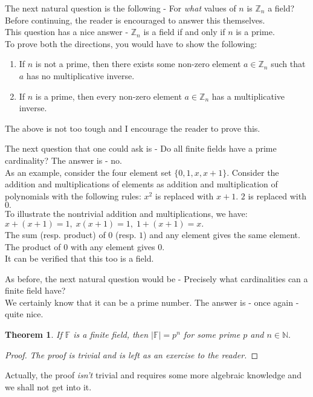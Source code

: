 \documentclass[12pt]{article}
\newtheorem{theorem}{Theorem}
\begin{document}
The next natural question is the following - For \emph{what} values of $n$ is $\mathbb{Z}_n$ a field?\\
Before continuing, the reader is encouraged to answer this themselves. \\
This question has a nice answer - $\mathbb{Z}_n$ is a field if and only if $n$ is a prime.\\
To prove both the directions, you would have to show the following:
\begin{enumerate}[nosep] 
	\item If $n$ is not a prime, then there exists some non-zero element $a \in \mathbb{Z}_n$ such that $a$ has no multiplicative inverse.
	\item If $n$ is a prime, then every non-zero element $a \in \mathbb{Z}_n$ has a multiplicative inverse.
\end{enumerate}
The above is not too tough and I encourage the reader to prove this.

%
The next question that one could ask is - Do all finite fields have a prime cardinality? The answer is - no.\\
As an example, consider the four element set $\{0, 1, x, x + 1\}.$ Consider the addition and multiplications of elements as addition and multiplication of polynomials with the following rules: $x^2$ is replaced with $x+1.$ $2$ is replaced with $0.$\\
To illustrate the nontrivial addition and multiplications, we have:\\
$x + (x + 1) = 1,\;x(x+1) = 1,\;1 + (x + 1) = x.$\\
The sum (resp. product) of $0$ (resp. $1$) and any element gives the same element. The product of $0$ with any element gives $0.$\\
It can be verified that this too is a field.

As before, the next natural question would be - Precisely what cardinalities can a finite field have?\\
We certainly know that it can be a prime number. The answer is - once again - quite nice.
\begin{theorem} 
	If $\mathbb{F}$ is a finite field, then $|\mathbb{F}| = p^n$ for some prime $p$ and $n \in \mathbb{N}.$
\end{theorem}
\begin{proof} 
	\emph{The proof is trivial and is left as an exercise to the reader.}
\end{proof}
Actually, the proof \emph{isn't} trivial and requires some more algebraic knowledge and we shall not get into it.
\end{document}
